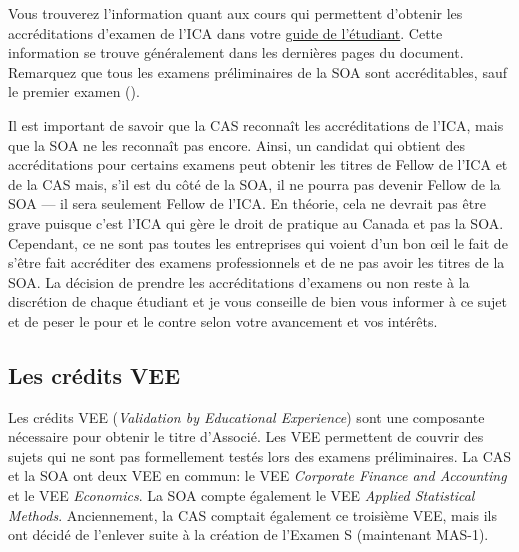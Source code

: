 Vous trouverez l'information quant aux cours qui permettent d'obtenir les accréditations d'examen de l'ICA dans votre \href{https://www.act.ulaval.ca/programmes-et-cours/premier-cycle/guide-de-letudiant/}{guide de l'étudiant}. Cette information se trouve généralement dans les dernières pages du document. Remarquez que tous les examens préliminaires de la SOA sont accréditables, sauf le premier examen (). \vspace{\baselineskip}

Il est important de savoir que la CAS reconnaît les accréditations de l'ICA, mais que la SOA ne les reconnaît pas encore. Ainsi, un candidat qui obtient des accréditations pour certains examens peut obtenir les titres de Fellow de l'ICA et de la CAS mais, s'il est du côté de la SOA, il ne pourra pas devenir Fellow de la SOA --- il sera seulement Fellow de l'ICA. En théorie, cela ne devrait pas être grave puisque c'est l'ICA qui gère le droit de pratique au Canada et pas la SOA. Cependant, ce ne sont pas toutes les entreprises qui voient d'un bon œil le fait de s'être fait accréditer des examens professionnels et de ne pas avoir les titres de la SOA. La décision de prendre les accréditations d'examens ou non reste à la discrétion de chaque étudiant et je vous conseille de bien vous informer à ce sujet et de peser le pour et le contre selon votre avancement et vos intérêts.

\newpage

\subsection*{Les crédits VEE}
\label{subsec:vee}
Les crédits VEE (\emph{Validation by Educational Experience}) sont une composante nécessaire pour obtenir le titre d'Associé. Les VEE permettent de couvrir des sujets qui ne sont pas formellement testés lors des examens préliminaires. La CAS et la SOA ont deux VEE en commun: le VEE \emph{Corporate Finance and Accounting} et le VEE \emph{Economics}. La SOA compte également le VEE \emph{Applied Statistical Methods}. Anciennement, la CAS comptait également ce troisième VEE, mais ils ont décidé de l'enlever suite à la création de l'Examen S (maintenant MAS-1).\vspace{\baselineskip}

